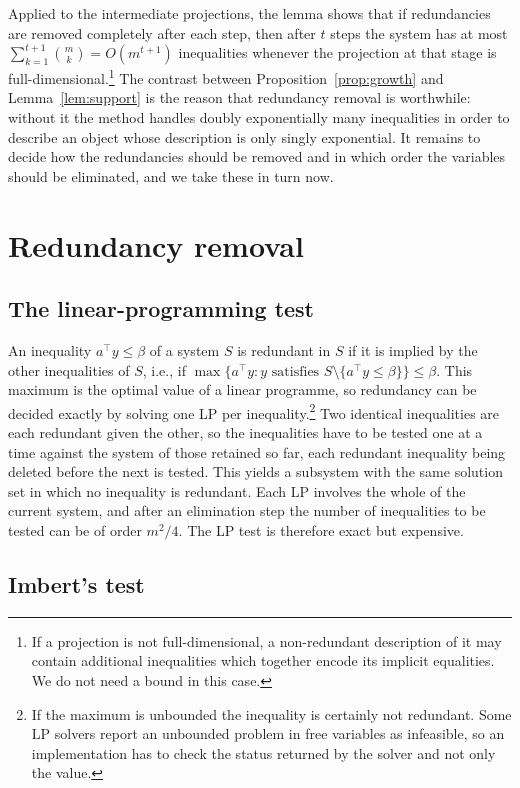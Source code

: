\documentclass[11pt]{article}
\theoremstyle{definition}
\begin{document}
Applied to the intermediate projections, the lemma shows that if redundancies are removed completely after each step, then after $t$ steps the system has at most $\sum_{k=1}^{t+1}\binom{m}{k}=O(m^{t+1})$ inequalities whenever the projection at that stage is full-dimensional.\footnote{If a projection is not full-dimensional, a non-redundant description of it may contain additional inequalities which together encode its implicit equalities. We do not need a bound in this case.} The contrast between Proposition~\ref{prop:growth} and Lemma~\ref{lem:support} is the reason that redundancy removal is worthwhile: without it the method handles doubly exponentially many inequalities in order to describe an object whose description is only singly exponential. It remains to decide how the redundancies should be removed and in which order the variables should be eliminated, and we take these in turn now.

\section{Redundancy removal}
\label{sec:redundancy}

\subsection{The linear-programming test}
\label{sec:lptest}

An inequality $a^{\top}y\le\beta$ of a system $S$ is redundant in $S$ if it is implied by the other inequalities of $S$, i.e., if $\max\{a^{\top}y : y \text{ satisfies } S\setminus\{a^{\top}y\le\beta\}\}\le\beta$. This maximum is the optimal value of a linear programme, so redundancy can be decided exactly by solving one LP per inequality.\footnote{If the maximum is unbounded the inequality is certainly not redundant. Some LP solvers report an unbounded problem in free variables as infeasible, so an implementation has to check the status returned by the solver and not only the value.} Two identical inequalities are each redundant given the other, so the inequalities have to be tested one at a time against the system of those retained so far, each redundant inequality being deleted before the next is tested. This yields a subsystem with the same solution set in which no inequality is redundant. Each LP involves the whole of the current system, and after an elimination step the number of inequalities to be tested can be of order $m^2/4$. The LP test is therefore exact but expensive.

\subsection{Imbert's test}
\label{sec:imbert}
\end{document}
